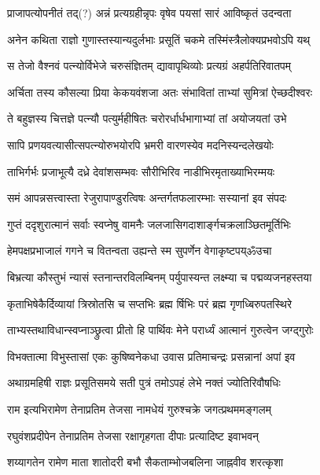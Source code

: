 \twolineshloka
{प्राजापत्योपनीतं तद्(?) अन्नं प्रत्यग्रहीन्नृपः}
{वृषेव पयसां सारं आविष्कृतं उदन्वता}%

\twolineshloka
{अनेन कथिता राज्ञो गुणास्तस्यान्यदुर्लभाः}
{प्रसूतिं चकमे तस्मिंस्त्रैलोक्यप्रभवोऽपि यथ्}%

\twolineshloka
{स तेजो वैश्नवं पत्न्योर्विभेजे चरुसंज्ञितम्}
{द्यावापृथिव्योः प्रत्यग्रं अहर्पतिरिवातपम्}%

\twolineshloka
{अर्चिता तस्य कौसल्या प्रिया केकयवंशजा}
{अतः संभावितां ताभ्यां सुमित्रां ऐच्छदीश्वरः}%

\twolineshloka
{ते बहुज्ञस्य चित्तज्ञे पत्न्यौ पत्युर्महीषितः}
{चरोरर्धार्धभागाभ्यां तां अयोजयतां उभे}%

\twolineshloka
{सापि प्रणयवत्यासीत्सपत्न्योरुभयोरपि}
{भ्रमरी वारणस्येव मदनिस्यन्दलेखयोः}%

\twolineshloka
{ताभिर्गर्भः प्रजाभूत्यै दध्रे देवांशसम्भवः}
{सौरीभिरिव नाडीभिरमृताख्याभिरम्मयः}%

\twolineshloka
{समं आपन्नसत्त्वास्ता रेजुरापाण्डुरत्विषः}
{अन्तर्गतफलारम्भाः सस्यानां इव संपदः}%

\twolineshloka
{गुप्तं ददृशुरात्मानं सर्वाः स्वप्नेषु वामनैः}
{जलजासिगदाशार्ङ्गचक्रलाञ्छितमूर्तिभिः}%

\twolineshloka
{हेमपक्षप्रभाजालं गगने च वितन्वता}
{उह्यन्ते स्म सुपर्णेन वेगाकृष्टपय्ॐउचा}%

\twolineshloka
{बिभ्रत्या कौस्तुभं न्यासं स्तनान्तरविलम्बिनम्}
{पर्युपास्यन्त लक्ष्म्या च पद्मव्यजनहस्तया}%

\twolineshloka
{कृताभिषेकैर्दिव्यायां त्रिस्रोतसि च सप्तभिः}
{ब्रह्म र्षिभिः परं ब्रह्म गृणध्बिरुपतस्थिरे}%

\twolineshloka
{ताभ्यस्तथाविधान्स्वप्नाञ्छ्रुत्वा प्रीतो हि पार्थिवः}
{मेने परार्ध्यं आत्मानं गुरुत्वेन जग्द्गुरोः}%

\twolineshloka
{विभक्तात्मा विभुस्तासां एकः कुषिष्वनेकधा}
{उवास प्रतिमाचन्द्रः प्रसन्नानां अपां इव}%

\twolineshloka
{अथाग्रमहिषी राज्ञः प्रसूतिसमये सती}
{पुत्रं तमोऽपहं लेभे नक्तं ज्योतिरिवौषधिः}%

\twolineshloka
{राम इत्यभिरामेण तेनाप्रतिम तेजसा}
{नामधेयं गुरुश्चक्रे जगत्प्रथममङ्गलम्}%

\twolineshloka
{रघुवंशप्रदीपेन तेनाप्रतिम तेजसा}
{रक्षागृहगता दीपाः प्रत्यादिष्ट इवाभवन्}%

\twolineshloka
{शय्यागतेन रामेण माता शातोदरी बभौ}
{सैकताम्भोजबलिना जाह्नवीव शरत्कृशा}%

